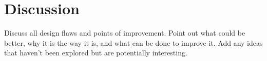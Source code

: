 \chapter{Discussion} \label{chap:discussion}

Discuss all design flaws and points of improvement. Point out what could be better, why it is the way it is, and what can be done to improve it. Add any ideas that haven't been explored but are potentially interesting.